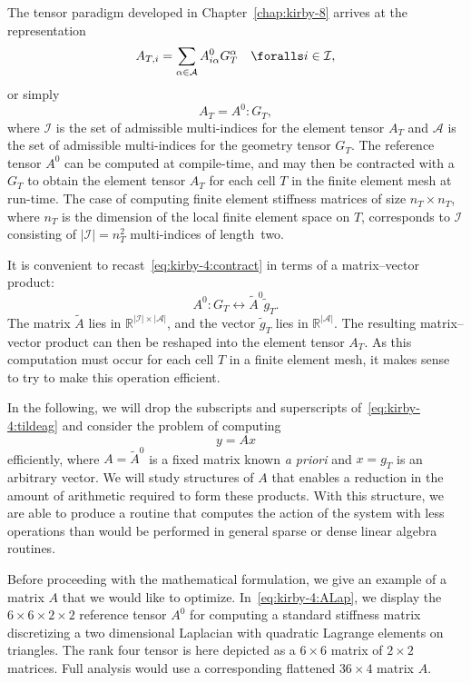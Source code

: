 The tensor paradigm developed in Chapter~\ref{chap:kirby-8} arrives at
the representation
\begin{equation}
  A_{T,i} = \sum_{\alpha\in\mathcal{A}} A^0_{i\alpha} G_T^{\alpha}
  \quad \foralls i \in \mathcal{I},
\end{equation}
or simply
\begin{equation} \label{eq:kirby-4:contract}
  A_T = A^0 : G_T,
\end{equation}
where $\mathcal{I}$ is the set of admissible multi-indices for the
element tensor $A_T$ and $\mathcal{A}$ is the set of admissible
multi-indices for the geometry tensor $G_T$. The reference tensor $
A^0 $ can be computed at compile-time, and may then be contracted with
a $ G_T $ to obtain the element tensor $A_T$ for each cell $T$ in
the finite element mesh at run-time. The case of computing finite
element stiffness matrices of size $n_T \times n_T$, where $n_T$ is
the dimension of the local finite element space on $T$, corresponds to
$ \mathcal{I} $ consisting of $|\mathcal{I}| = n_T^2$ multi-indices of
length~two.

It is convenient to recast~\eqref{eq:kirby-4:contract} in terms of a
matrix--vector product:
\begin{equation} \label{eq:kirby-4:tildeag}
  A^0 : G_T \leftrightarrow \tilde{A}^0 \tilde{g}_T.
\end{equation}
The matrix $ \tilde{A} $ lies in $ \mathbb{R}^{|\mathcal{I}| \times
  |\mathcal{A}|} $, and the vector $ \tilde{g}_{T} $ lies in $
\mathbb{R}^{|\mathcal{A}|} $. The resulting matrix--vector product can
then be reshaped into the element tensor $A_T$. As this computation
must occur for each cell $T$ in a finite element mesh, it makes
sense to try to make this operation efficient.

In the following, we will drop the subscripts and superscripts
of~\eqref{eq:kirby-4:tildeag} and consider the problem of computing
\begin{equation}
y = A x
\end{equation}
efficiently, where $ A = \tilde{A}^0 $ is a fixed matrix known \emph{a
  priori} and $ x = g_T $ is an arbitrary vector. We will study
structures of $ A $ that enables a reduction in the amount of
arithmetic required to form these products.  With this structure, we
are able to produce a routine that computes the action of the system
with less operations than would be performed in general sparse or
dense linear algebra routines.

Before proceeding with the mathematical formulation, we give an
example of a matrix $ A $ that we would like to
optimize. In~\eqref{eq:kirby-4:ALap}, we display the $6 \times 6
\times 2 \times 2$ reference tensor $A^0$ for computing a standard
stiffness matrix discretizing a two dimensional Laplacian with
quadratic Lagrange elements on triangles. The rank four tensor is here
depicted as a $6 \times 6$ matrix of $2 \times 2$ matrices. Full
analysis would use a corresponding flattened $36 \times 4$ matrix $A$.

